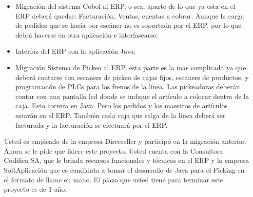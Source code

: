 \documentclass{article}
\begin{document}
	\begin{itemize}
		\itemsep=3pt \topsep=0pt \partopsep=0pt \parskip=0pt \parsep=0pt

		\item Migración del sistema Cobol al ERP, o sea, aparte de lo que ya esta en el ERP deberá quedar: Facturación, Ventas, cuentas a cobrar. Aunque la carga de pedidos que se hacía por escáner no es soportada por el ERP, por lo que debrá hacerse en otra aplicación e interfasearse;

		\item Interfaz del ERP con la aplicación Java;

		\item Migración Sistema de Pickeo al ERP, esta parte es la mas complicada ya que deberá contarse con escaners de pickeo de cajas fijos, escaners de productos, y programación de PLCs para los frenos de la línea. Las pickeadoras deberán contar con una pantalla lcd donde se indique el artículo a colocar dentro de la caja. Esto correra en Java. Pero los pedidos y los maestros de artículos estarán en el ERP. También cada caja que salga de la línea deberá ser facturada y la facturación se efectuará por el ERP.

	\end{itemize}
	\medskip

	Usted es empleado de la empresa Direcseller y participó en la migración anterior. Ahora se le pide que lidere este proyecto. Usted cuenta con la Consultora Codifica SA, que le brinda recursos funcionales y técnicos en el ERP y la empresa SoftAplicación que es candidata a tomar el desarrollo de Java para el Picking en el formato de llame en mano. El plazo que usted tiene para terminar este proyecto es de 1 año.

\bigskip






\end{document}
